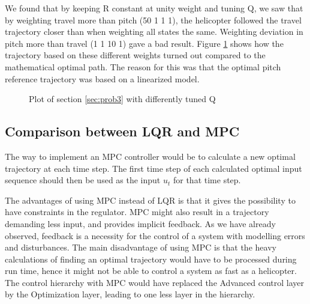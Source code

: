 We found that by keeping R constant at unity weight and tuning Q, we saw that by weighting travel more than pitch (50 1 1 1), the helicopter followed the travel trajectory closer than when weighting all states the same. Weighting deviation in pitch more than travel (1 1 10 1) gave a bad result. Figure \ref{fig:day3_plot_allQ} shows how the trajectory based on these different weights turned out compared to the mathematical optimal path. The reason for this was that the optimal pitch reference trajectory was based on a linearized model.

\begin{figure}[htb]
	\centering
	\caption{Plot of section \ref{sec:prob3} with differently tuned Q}
	\label{fig:day3_plot_allQ}
\end{figure}




\subsection{Comparison between LQR and MPC}
The way to implement an MPC controller would be to calculate a new optimal trajectory at each time step. The first time step of each calculated optimal input sequence should then be used as the input $u_t$ for that time step.

The advantages of using MPC instead of LQR is that it gives the possibility to have constraints in the regulator. MPC might also result in a trajectory demanding less input, and provides implicit feedback. As we have already observed, feedback is a necessity for the control of a system with modelling errors and disturbances.
The main disadvantage of using MPC is that the heavy calculations of finding an optimal trajectory would have to be processed during run time, hence it might not be able to control a system as fast as a helicopter.
The control hierarchy with MPC would have replaced the Advanced control layer by the Optimization layer, leading to one less layer in the hierarchy.

